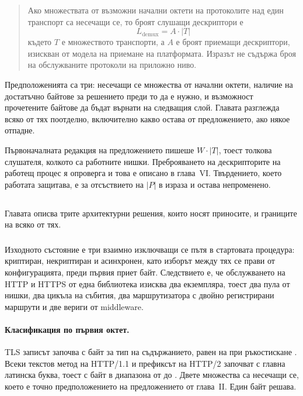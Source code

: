 \begin{quote}
Ако множествата от възможни начални октети на протоколите над един транспорт са несечащи се,
то броят слушащи дескриптори е
\[ L_{\text{demux}} = A \cdot |T| \]
където \(T\) е множеството транспорти, а \(A\) е броят приемащи дескриптори, изискван от
модела на приемане на платформата. Изразът не съдържа броя на обслужваните протоколи на
приложно ниво.
\end{quote}

Предположенията са три: несечащи се множества от начални октети, наличие на достатъчно байтове
за решението преди то да е нужно, и възможност прочетените байтове да бъдат върнати на
следващия слой. Главата разглежда всяко от тях поотделно, включително какво остава от
предложението, ако някое отпадне.

Първоначалната редакция на предложението пишеше \(W \cdot |T|\), тоест толкова слушателя,
колкото са работните нишки. Преброяването на дескрипторите на работещ процес я опроверга и
това е описано в глава~VI. Твърдението, което работата защитава, е за отсъствието на \(|P|\) в
израза и остава непроменено.

\subsection*{}

Главата описва трите архитектурни решения, които носят приносите, и границите на всяко от тях.

\subsubsection*{}

Изходното състояние е три взаимно изключващи се пътя в стартовата процедура: криптиран,
некриптиран и асинхронен, като изборът между тях се прави от конфигурацията, преди първия
приет байт. Следствието е, че обслужването на HTTP и HTTPS от една библиотека изисква два
екземпляра, тоест два пула от нишки, два цикъла на събития, два маршрутизатора с двойно
регистрирани маршрути и две вериги от middleware.

\paragraph{Класификация по първия октет.} TLS записът започва с байт за тип на съдържанието,
равен на  при ръкостискане \cite{rfc8446}. Всеки текстов метод на HTTP/1.1 и
префиксът на HTTP/2 започват с главна латинска буква, тоест с байт в диапазона от 
до  \cite{rfc9112}. Двете множества са несечащи се, което е точно предположението
на предложението от глава~II. Един байт решава.

